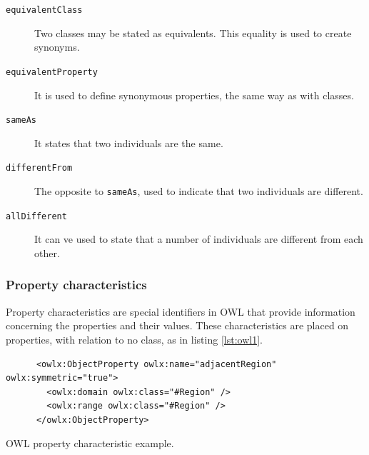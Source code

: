 \begin{description}
\item[\texttt{equivalentClass}] Two classes may be stated as equivalents. This equality is used to create synonyms.

\item[\texttt{equivalentProperty}] It is used to define synonymous properties, the same way as with classes.

\item[\texttt{sameAs}] It states that two individuals are the same.

\item[\texttt{differentFrom}] The opposite to \texttt{sameAs}, used to indicate that two individuals are different. 

\item[\texttt{allDifferent}] It can ve used to state that a number of individuals are different from each other.
\end{description}

\subsubsection*{Property characteristics}

Property characteristics are special identifiers in OWL that provide information concerning the properties and their values. These characteristics are placed on properties, with relation to no class, as in listing \ref{lst:owl1}.


\begin{listing}\centering
  \begin{minipage}{.8\textwidth}
    \begin{verbatim}
      <owlx:ObjectProperty owlx:name="adjacentRegion" owlx:symmetric="true">
        <owlx:domain owlx:class="#Region" /> 
        <owlx:range owlx:class="#Region" />
      </owlx:ObjectProperty>
    \end{verbatim}
  \end{minipage}
  \caption{OWL property characteristic example.}\label{lst:owl1}
\end{listing}


